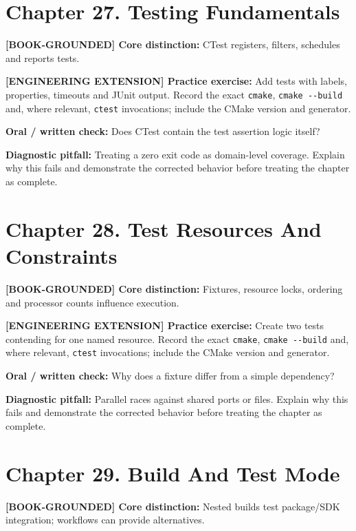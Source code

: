 \documentclass[11pt,letterpaper,oneside]{report}
\providecommand{\passthrough}[1]{#1}
\begin{document}
\section{Chapter 27. Testing
Fundamentals}\label{chapter-27.-testing-fundamentals}

\textbf{{[}BOOK-GROUNDED{]} Core distinction:} CTest registers, filters,
schedules and reports tests.

\textbf{{[}ENGINEERING EXTENSION{]} Practice exercise:} Add tests with
labels, properties, timeouts and JUnit output. Record the exact
\passthrough{\lstinline!cmake!}, \passthrough{\lstinline!cmake --build!}
and, where relevant, \passthrough{\lstinline!ctest!} invocations;
include the CMake version and generator.

\textbf{Oral / written check:} Does CTest contain the test assertion
logic itself?

\textbf{Diagnostic pitfall:} Treating a zero exit code as domain-level
coverage. Explain why this fails and demonstrate the corrected behavior
before treating the chapter as complete.

\section{Chapter 28. Test Resources And
Constraints}\label{chapter-28.-test-resources-and-constraints}

\textbf{{[}BOOK-GROUNDED{]} Core distinction:} Fixtures, resource locks,
ordering and processor counts influence execution.

\textbf{{[}ENGINEERING EXTENSION{]} Practice exercise:} Create two tests
contending for one named resource. Record the exact
\passthrough{\lstinline!cmake!}, \passthrough{\lstinline!cmake --build!}
and, where relevant, \passthrough{\lstinline!ctest!} invocations;
include the CMake version and generator.

\textbf{Oral / written check:} Why does a fixture differ from a simple
dependency?

\textbf{Diagnostic pitfall:} Parallel races against shared ports or
files. Explain why this fails and demonstrate the corrected behavior
before treating the chapter as complete.

\section{Chapter 29. Build And Test
Mode}\label{chapter-29.-build-and-test-mode}

\textbf{{[}BOOK-GROUNDED{]} Core distinction:} Nested builds test
package/SDK integration; workflows can provide alternatives.
\end{document}
